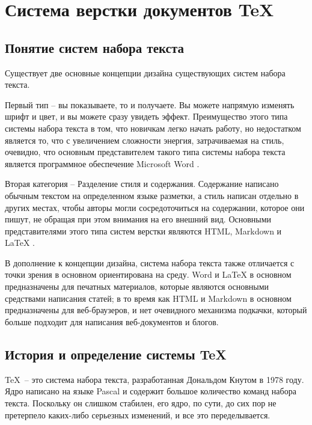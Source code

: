 
\chapter{Система верстки документов \TeX}

\section{Понятие систем набора текста}
Существует две основные концепции дизайна существующих систем набора текста. 

Первый тип --  вы показываете, то и получаете\guillemotright. Вы можете напрямую изменять шрифт и цвет, и вы можете сразу увидеть эффект. Преимущество этого типа системы набора текста в том, что новичкам легко начать работу, но недостатком является то, что с увеличением сложности энергия, затрачиваемая на стиль, очевидно, что основным представителем такого типа системы набора текста является программное обеспечение Microsoft Word \cite{18}. 

Вторая категория -- \guillemotleft Разделение стиля и содержания\guillemotright. Содержание написано обычным текстом на определенном \guillemotleft языке разметки\guillemotright, а стиль написан отдельно в других местах, чтобы авторы могли сосредоточиться на содержании, которое они пишут, не обращая при этом внимания на его внешний вид. Основными представителями этого типа систем верстки являются HTML, Markdown и LaTeX \cite{19}.

В дополнение к концепции дизайна, система набора текста также отличается с точки зрения \guillemotleft в основном ориентирована на среду\guillemotright. Word и LaTeX в основном предназначены для печатных материалов, которые являются основными средствами написания статей; в то время как HTML и Markdown в основном предназначены для веб-браузеров, и нет очевидного механизма подкачки, который больше подходит для написания веб-документов и блогов.



\section{История и определение системы \TeX}

\TeX  \verb| |-- это система набора текста, разработанная Дональдом Кнутом в 1978 году. Ядро написано на языке Pascal и содержит большое количество команд набора текста. Поскольку он слишком стабилен, его ядро, по сути, до сих пор не претерпело каких-либо серьезных изменений, и все это переделывается.

